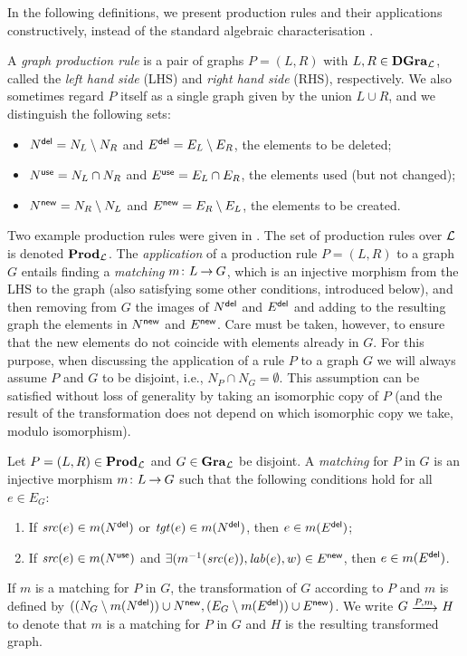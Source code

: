 In the following definitions, we present production rules and their
applications constructively, instead of the standard algebraic
characterisation \cite{DPO}. %
%
\begin{definition}
  A {\em graph production rule} is a pair of graphs $P=(L,R)$ with $L,R\in
  \mathbf{DGra}_{\cal L}$, called the \emph{left hand side} (LHS) and \emph{right hand
  side} (RHS), respectively. We also sometimes regard $P$ itself as a single
  graph given by the union $L\cup R$, and we distinguish the following sets:
%
  \begin{itemize}\smalltopsep\noitemsep
  \item $N^{\mathsf{del}} = N_L\setminus N_R$ and $E^{\mathsf{del}} = E_L\setminus E_R$, the
    elements to be deleted;
  \item $N^{\mathsf{use}} = N_L\cap N_R$ and $E^{\mathsf{use}} = E_L\cap E_R$, the elements used
    (but not changed);
  \item $N^{\mathsf{new}} = N_R\setminus N_L$ and $E^{\mathsf{new}} = E_R\setminus E_L$, the
    elements to be created.
  \end{itemize}
\end{definition}
%
Two example production rules were given in . The set of
production rules over ${\cal L}$ is denoted $\mathbf{Prod}_{\cal L}$.  The \emph{application} of a
production rule $P=(L,R)$ to a graph $G$ entails finding a \emph{matching}
$m\colon {L} \mathbin{\rightarrow} {G}$, which is an injective morphism from the LHS to the graph (also
satisfying some other conditions, introduced below), and then removing from $G$
the images of $N^{\mathsf{del}}$ and $E^{\mathsf{del}}$ and adding to the resulting graph the
elements in $N^{\mathsf{new}}$ and $E^{\mathsf{new}}$. Care must be taken, however, to ensure that
the new elements do not coincide with elements already in $G$.
For this purpose, when discussing the application of a rule $P$ to a graph $G$
we will always assume $P$ and $G$ to be disjoint, i.e., $N_P\cap N_G=
\emptyset$. This assumption can be satisfied without loss of generality by
taking an isomorphic copy of $P$ (and the result of the transformation does not
depend on which isomorphic copy we take, modulo isomorphism).
%
\begin{definition}
  Let $P=(L,R)\in \mathbf{Prod}_{\cal L}$ and $G\in \mathbf{Gra}_{\cal L}$ be disjoint. A \emph{matching}
  for $P$ in $G$ is an injective morphism $m\colon {L} \mathbin{\rightarrow} {G}$ such that the following
  conditions hold for all $e\in E_G$:
  \begin{enumerate}\noitemsep\smalltopsep
  \item If $\mathit{src}(e)\in m(N^{\mathsf{del}})$ or $\mathit{tgt}(e)\in m(N^{\mathsf{del}})$, then $e\in
    m(E^{\mathsf{del}})$;
  \item If $\mathit{src}(e)\in m(N^{\mathsf{use}})$ and $\exists(m^{-1}(\mathit{src}(e)), \mathit{lab}(e), w)\in
    E^{\mathsf{new}}$, then $e\in m(E^{\mathsf{del}})$.
  \end{enumerate}\smallbottomsep
  If $m$ is a matching for $P$ in $G$, the transformation of $G$ according to
  $P$ and $m$ is defined by $((N_G\setminus m(N^{\mathsf{del}}))\cup N^{\mathsf{new}},(E_G
  \setminus m(E^{\mathsf{del}}))\cup E^{\mathsf{new}})$. We write $G\trans{P,m} H$ to denote that
  $m$ is a matching for $P$ in $G$ and $H$ is the resulting transformed graph.
\end{definition}
